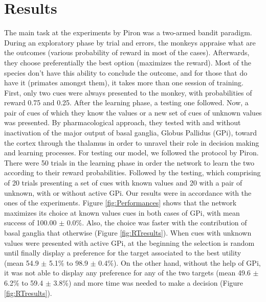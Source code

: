 \section{Results}

	The main task at the experiments by Piron was a two-armed bandit paradigm. During an exploratory phase by trial and errors, the monkeys appraise what are the outcomes (various probability of reward in most of the cases). Afterwards, they choose preferentially the best option (maximizes the reward). Most of the species don't have this ability to conclude the outcome, and for those that do have it (primates amongst them), it takes more than one session of training. 
	First, only two cues were always presented to the monkey, with probabilities of reward 0.75 and 0.25. After the learning phase, a testing one followed. Now, a pair of cues of which they know the values or  a new set of cues of unknown values was presented. By pharmacological approach, they tested with and without inactivation of the major output of basal ganglia, Globus Pallidus (GPi), toward the cortex through the thalamus in order to unravel their role in decision making and learning processes.
	For testing our model, we followed the protocol by Piron. There were 50 trials in the learning phase in order the network to learn the two according to their reward probabilities. Followed by the testing, which comprising of 20 trials presenting a set of cues with known values and 20 with a pair of unknown, with or without active GPi.
	Our results were in accordance with the ones of the experiments. Figure \ref{fig:Performances} shows that the network maximizes its choice at known values cues in both cases of GPi, with mean success of 100.00 $\pm$ 0.0\%. Also, the choice was faster with the contribution of basal ganglia that otherwise (Figure \ref{fig:RTresults}). When cues with unknown values were presented with active GPi, at the beginning the selection is random until finally display a preference for the target associated to the best utility (mean 54.9 $\pm$ 5.1\% to 98.9 $\pm$ 0.4\%). On the other hand, without the help of GPi, it was not able to display any preference for any of the two targets (mean 49.6 $\pm$ 6.2\% to 59.4 $\pm$ 3.8\%) and more time was needed to make a decision (Figure \ref{fig:RTresults}). 
